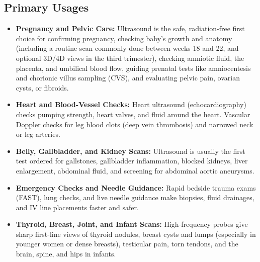\subsection{Primary Usages}
\begin{itemize}
  \item \textbf{Pregnancy and Pelvic Care:} Ultrasound is the safe, radiation-free first choice for confirming pregnancy, checking baby's growth and anatomy (including a routine scan commonly done between weeks 18 and 22, and optional 3D/4D views in the third trimester), checking amniotic fluid, the placenta, and umbilical blood flow, guiding prenatal tests like amniocentesis and chorionic villus sampling (CVS), and evaluating pelvic pain, ovarian cysts, or fibroids.
  \item \textbf{Heart and Blood-Vessel Checks:} Heart ultrasound (echocardiography) checks pumping strength, heart valves, and fluid around the heart. Vascular Doppler checks for leg blood clots (deep vein thrombosis) and narrowed neck or leg arteries.
  \item \textbf{Belly, Gallbladder, and Kidney Scans:} Ultrasound is usually the first test ordered for gallstones, gallbladder inflammation, blocked kidneys, liver enlargement, abdominal fluid, and screening for abdominal aortic aneurysms.
  \item \textbf{Emergency Checks and Needle Guidance:} Rapid bedside trauma exams (FAST), lung checks, and live needle guidance make biopsies, fluid drainages, and IV line placements faster and safer.
  \item \textbf{Thyroid, Breast, Joint, and Infant Scans:} High-frequency probes give sharp first-line views of thyroid nodules, breast cysts and lumps (especially in younger women or dense breasts), testicular pain, torn tendons, and the brain, spine, and hips in infants.
\end{itemize}


